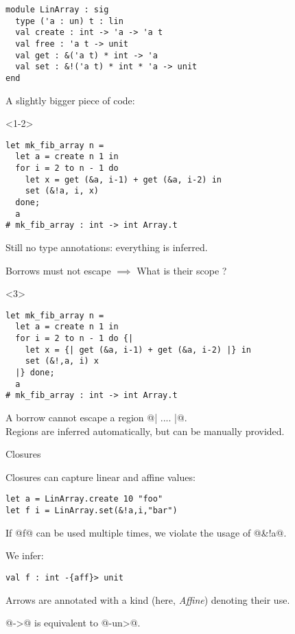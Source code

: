 \documentclass[xcolor=svgnames,11pt]{beamer}
\begin{document}
\begin{frame}[t,fragile]
\begin{lstlisting}
module LinArray : sig
  type ('a : un) t : lin
  val create : int -> 'a -> 'a t
  val free : 'a t -> unit
  val get : &('a t) * int -> 'a
  val set : &!('a t) * int * 'a -> unit
end
\end{lstlisting}

A slightly bigger piece of code:

\begin{onlyenv}<1-2>
\begin{lstlisting}
let mk_fib_array n =
  let a = create n 1 in
  for i = 2 to n - 1 do
    let x = get (&a, i-1) + get (&a, i-2) in
    set (&!a, i, x)
  done;
  a
# mk_fib_array : int -> int Array.t
\end{lstlisting}

Still no type annotations: everything is inferred.\pause

Borrows must not escape $\implies$ What is their scope ?
\end{onlyenv}
\begin{onlyenv}<3>
\begin{lstlisting}
let mk_fib_array n =
  let a = create n 1 in
  for i = 2 to n - 1 do {|
    let x = {| get (&a, i-1) + get (&a, i-2) |} in
    set (&!,a, i) x
  |} done;
  a
# mk_fib_array : int -> int Array.t
\end{lstlisting}

A borrow cannot escape a region @{| .... |}@.\\
Regions are inferred automatically, but can be manually provided.
\end{onlyenv}

\end{frame}

\begin{frame}[fragile]{Closures}

  Closures can capture linear and affine values:

\begin{lstlisting}
let a = LinArray.create 10 "foo"
let f i = LinArray.set(&!a,i,"bar")
\end{lstlisting}

If @f@ can be used multiple times, we violate the usage of @&!a@.\pause

We infer:
\begin{lstlisting}
val f : int -{aff}> unit
\end{lstlisting}

Arrows are annotated with a kind (here, \emph{Affine}) denoting their use.

@->@ is equivalent to @-{un}>@.

\end{frame}
\end{document}
